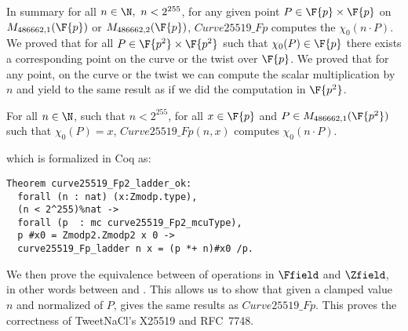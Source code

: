 In summary for all $n \in \N,\ n < 2^{255}$, for any given point $P\in\F{p}\times\F{p}$
on $M_{486662,1}(\F{p})$ or $M_{486662,2}(\F{p})$, $Curve25519\_Fp$
computes the $\chi_0(n \cdot P)$.
We proved that for all $P \in \F{p^2}\times\F{p^2}$ such that $\chi_0(P) \in \F{p}$
there exists a corresponding point on the curve or the twist over $\F{p}$.
We proved that for any point, on the curve or the twist we can compute the
scalar multiplication by $n$ and yield to the same result as if we did the
computation in $\F{p^2}$.
\begin{theorem}
  \label{thm:general-scalarmult}
  For all $n \in \N$, such that $n < 2^{255}$,
  for all $x \in \F{p}$ and $P \in M_{486662,1}(\F{p^2})$ such that $\chi_0(P) = x$,
  $Curve25519\_Fp(n,x)$ computes $\chi_0(n \cdot P)$.
\end{theorem}
which is formalized in Coq as:
\begin{lstlisting}[language=Coq]
Theorem curve25519_Fp2_ladder_ok:
  forall (n : nat) (x:Zmodp.type),
  (n < 2^255)%nat ->
  forall (p  : mc curve25519_Fp2_mcuType),
  p #x0 = Zmodp2.Zmodp2 x 0 ->
  curve25519_Fp_ladder n x = (p *+ n)#x0 /p.
\end{lstlisting}

We then prove the equivalence between of operations in $\Ffield$ and $\Zfield$,
in other words between  and .
This allows us to show that given a clamped value $n$ and normalized \xcoord of $P$,
 gives the same results as $Curve25519\_Fp$.
This proves the correctness of TweetNaCl's X25519 and RFC~7748.
